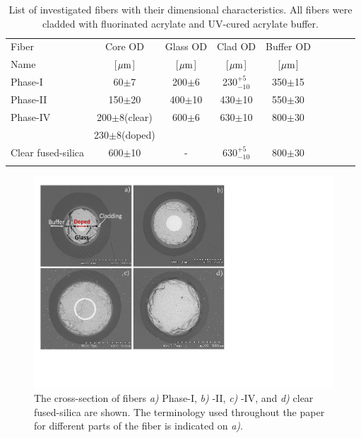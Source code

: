 \documentclass[a4paper,11pt]{article}
\begin{document}
\begin{table}[htp]
\caption{\small List of investigated fibers with their dimensional characteristics. All fibers were cladded with fluorinated acrylate and UV-cured acrylate buffer.}
\vspace{-2 mm}
\begin{center}
{\small
\begin{tabular}{|l|c|c|c|c|c|c|c|c|} \hline
Fiber              &  Core OD            & Glass OD        & Clad OD          & Buffer  OD        \\
Name               &[${\rm \mu m}$]      & [${\rm \mu m}$] & [${\rm \mu m}$]  & [${\rm \mu m}$]   \\
\hline
Phase-I            & 60$\pm$7            &	200$\pm$6      & 230$^{+5}_{-10}$ &	350$\pm$15        \\
Phase-II           & 150$\pm$20		     &	400$\pm$10     & 430$\pm$10	      &	550$\pm$30        \\
Phase-IV           & 200$\pm$8(clear)   &	600$\pm$6	   & 630$\pm$10       &	800$\pm$30        \\
                          & 230$\pm$8(doped) &	   &     &	         \\
Clear fused-silica & 600$\pm$10          &-				   & 630$^{+5}_{-10}$ &	800$\pm$30	      \\
                    &                     &                &                  & \\
\hline
\end{tabular}
}
\end{center}
\label{tab:fiberlist}
\end{table}


\begin{figure}[ht]
\begin{center}\vspace{-1pc}
      \includegraphics[width=10 cm]{Figures/allfiberimage2.pdf}
\caption{\small The cross-section of fibers
{\it a)} Phase-I,
{\it b)} -II,
{\it c)} -IV, and
{\it d)} clear fused-silica are shown.  The terminology used throughout the paper for different parts of the fiber is indicated on {\it a)}.}
    \label{fig:FiberCrossSections}
\end{center}
\end{figure}
\end{document}
